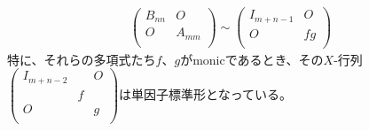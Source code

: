 \documentclass[dvipdfmx]{jsarticle}
\begin{document}
\begin{thm}
\begin{itemize}
\begin{align*}
\begin{pmatrix}
B_{nn} & O \\
O & A_{mm} \\
\end{pmatrix} \sim \begin{pmatrix}
I_{m + n - 1} & O \\
O & fg \\
\end{pmatrix}
\end{align*}
  特に、それらの多項式たち$f$、$g$がmonicであるとき、その$X$-行列$\begin{pmatrix}
I_{m + n - 2} & \  & O \\
\  & f & \  \\
O & \  & g \\
\end{pmatrix}$は単因子標準形となっている。
\end{itemize}
\end{thm}
\end{document}
